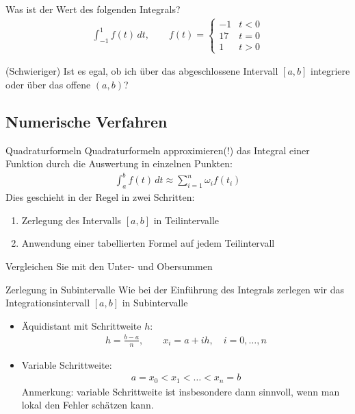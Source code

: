 \begin{Abschluss}
\item Was ist der Wert des folgenden Integrals?
  \begin{gather*}
    \int_{-1}^1 f(t)\,dt,
    \qquad f(t) = \begin{cases}
      -1 & t<0\\
      17 & t=0\\
      1 & t>0
    \end{cases}
  \end{gather*}
\item (Schwieriger) Ist es egal, ob ich über das abgeschlossene Intervall $[a,b]$ integriere oder über das offene $(a,b)$?
\end{Abschluss}

\subsection{Numerische Verfahren}

\begin{frame}{Quadraturformeln}
  Quadraturformeln approximieren(!) das Integral einer Funktion durch die Auswertung in einzelnen Punkten:
  \begin{gather*}
    \int_a^b f(t)\,dt \approx \sum_{i=1}^n \omega_i f(t_i)  
  \end{gather*}
  \pause
  Dies geschieht in der Regel in zwei Schritten:
  \begin{enumerate}
      \item Zerlegung des Intervalls $[a,b]$ in Teilintervalle
      \item Anwendung einer tabellierten Formel auf jedem Teilintervall
  \end{enumerate}
  \pause
  \begin{Denkpause}
  Vergleichen Sie mit den Unter- und Obersummen
  \end{Denkpause}
\end{frame}

\begin{frame}{Zerlegung in Subintervalle}
    Wie bei der Einführung des Integrals zerlegen wir das Integrationsintervall $[a,b]$ in Subintervalle
    \begin{itemize}
        \item Äquidistant mit \glqq{}Schrittweite\grqq{} $h$:
        \begin{gather*}
            h = \frac{b-a}n,
            \qquad
            x_i = a+ih, \quad i=0,\dots,n
        \end{gather*}
        \item Variable Schrittweite:
        \begin{gather*}
            a=x_0 < x_1 < \dots < x_n=b
        \end{gather*}
        Anmerkung: variable Schrittweite ist insbesondere dann sinnvoll, wenn man lokal den Fehler schätzen kann.
    \end{itemize}
\end{frame}

